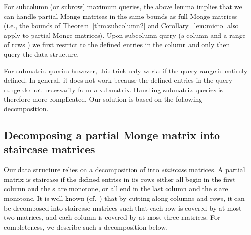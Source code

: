 \documentclass{llncs}
\begin{document}
For subcolumn (or subrow) maximum queries, the above lemma implies that we can handle partial Monge matrices in the same bounds as full Monge matrices (i.e., the bounds of Theorem~\ref{thm:subcolumn2} and Corollary~\ref{lem:micro} also apply to partial Monge matrices). 
Upon subcolumn query (a column  and a range of rows ) we first restrict  to the defined entries in the column   and only then query the data structure. 

For submatrix queries however, this trick only works if the query range is entirely defined. In general, it does not work because the defined entries in the query range do not necessarily form a submatrix. Handling submatrix queries is therefore more complicated. Our solution is based on the following decomposition. 

\subsection{Decomposing a partial Monge matrix into staircase matrices}  

Our data structure relies on a decomposition of  into {\em staircase}
matrices. A partial matrix is staircase if the defined entries in its rows either all  begin in the first column and the s are monotone, or all end in the last column and the s are monotone. 
It is well known (cf.~\cite{AggarwalK90}) that by cutting
 along columns and rows, it can be decomposed into staircase
matrices  such that each row is covered by at most two matrices,
and each column is covered by at most three  matrices. 
For completeness, we  describe such a decomposition below.
\end{document}
